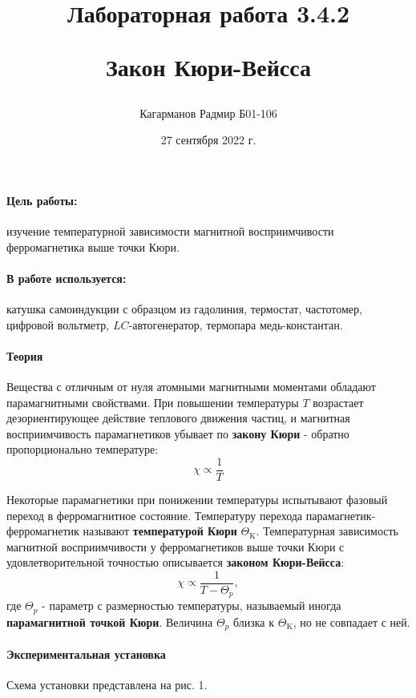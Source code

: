 \documentclass[a4paper,12pt]{article}
\title{Лабораторная работа 3.4.2 

Закон Кюри-Вейсса}
\author{Кагарманов Радмир Б01-106}
\date{27 сентября 2022 г.}
\begin{document}
\maketitle
\thispagestyle{empty}
\newpage
\setcounter{page}{1}

\paragraph{Цель работы:}изучение температурной зависимости магнитной восприимчивости ферромагнетика выше точки Кюри.
\paragraph{В работе используется:}катушка самоиндукции с образцом из гадолиния, термостат, частотомер, цифровой вольтметр, $LC$-автогенератор, термопара медь-константан.
\paragraph{Теория\\}
Вещества с отличным от нуля атомными магнитными моментами обладают парамагнитными свойствами. При повышении температуры $T$ возрастает дезориентирующее действие теплового движения частиц, и магнитная восприимчивость парамагнетиков убывает по \textbf{закону Кюри} - обратно пропорционально температуре:
\begin{equation}
    \chi \propto \frac{1}{T}
\end{equation}\par
Некоторые парамагнетики при понижении температуры испытывают фазовый переход в ферромагнитное состояние. Температуру перехода парамагнетик-ферромагнетик называют \textbf{температурой Кюри} $\Theta_{\text{K}}$. Температурная зависимость магнитной восприимчивости у ферромагнетиков выше точки Кюри с удовлетворительной точностью описывается \textbf{законом Кюри-Вейсса}:
\begin{equation}
    \chi \propto \frac{1}{T-\Theta_{p}},
\end{equation}
где $\Theta_{p}$ - параметр с размерностью температуры, называемый иногда \textbf{парамагнитной точкой Кюри}. Величина $\Theta_{p}$ близка к $\Theta_{\text{K}}$, но не совпадает с ней.
\paragraph{Экспериментальная установка\\}
Схема установки представлена на рис. 1.
\end{document}
